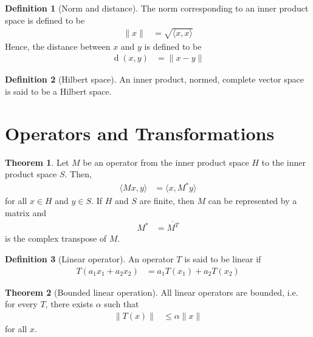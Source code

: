 \documentclass[titlepage, fleqn, a4paper, 12pt, twoside]{article}
\theoremstyle{definition}
\newtheorem{definition}{Definition}
\theoremstyle{theorem}
\newtheorem{theorem}{Theorem}
\DeclareMathOperator{\dist}{\mathrm{d}}
\begin{document}
\begin{definition}[Norm and distance]
	The norm corresponding to an inner product space is defined to be
	\begin{align*}
		\|x\| &= \sqrt{\langle x,x \rangle}
	\end{align*}
	Hence, the distance between $x$ and $y$ is defined to be
	\begin{align*}
		\dist(x,y) &= \|x - y\|
	\end{align*}
\end{definition}

\begin{definition}[Hilbert space]
	An inner product, normed, complete vector space is said to be a Hilbert space.
\end{definition}

\section{Operators and Transformations}

\begin{theorem}
	Let $M$ be an operator from the inner product space $H$ to the inner product space $S$.
	Then,
	\begin{align*}
		\langle M x , y \rangle &= \langle x , M^* y \rangle
	\end{align*}
	for all $x \in H$ and $y \in S$.
	If $H$ and $S$ are finite, then $M$ can be represented by a matrix and
	\begin{align*}
		M^* &= \overline{M^T}
	\end{align*}
	is the complex transpose of $M$.
\end{theorem}

\begin{definition}[Linear operator]
	An operator $T$ is said to be linear if
	\begin{align*}
		T(a_1 x_1 + a_2 x_2) &= a_1 T(x_1) + a_2 T(x_2)
	\end{align*}
\end{definition}

\begin{theorem}[Bounded linear operation]
	All linear operators are bounded, i.e. for every $T$, there exists $\alpha$ such that
	\begin{align*}
		\left\| T(x) \right\| &\le \alpha \|x\|
	\end{align*}
	for all $x$.
\end{theorem}
\end{document}
